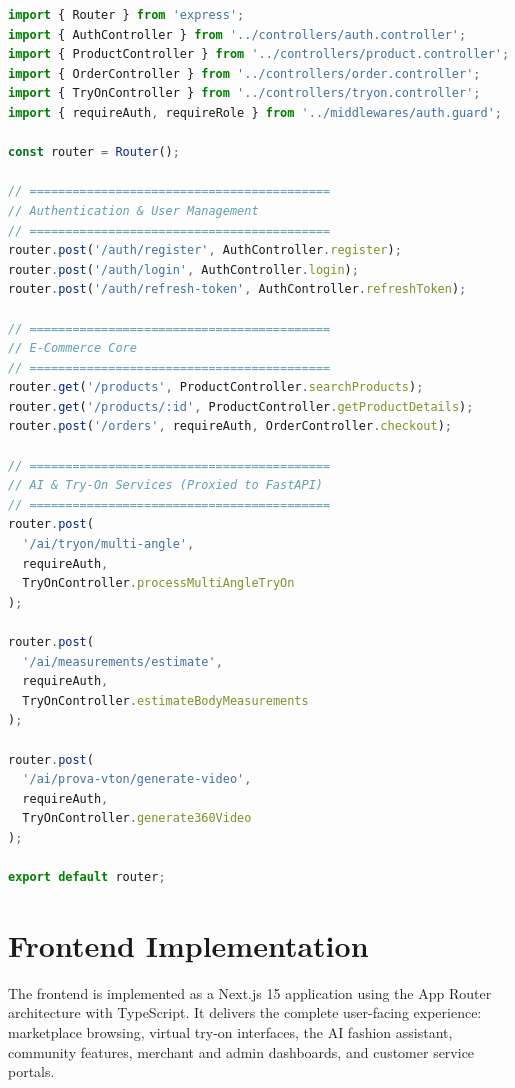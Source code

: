 \begin{lstlisting}[language=JavaScript, caption=Backend API router configuration., label=lst:backend-api]
import { Router } from 'express';
import { AuthController } from '../controllers/auth.controller';
import { ProductController } from '../controllers/product.controller';
import { OrderController } from '../controllers/order.controller';
import { TryOnController } from '../controllers/tryon.controller';
import { requireAuth, requireRole } from '../middlewares/auth.guard';

const router = Router();

// ==========================================
// Authentication & User Management
// ==========================================
router.post('/auth/register', AuthController.register);
router.post('/auth/login', AuthController.login);
router.post('/auth/refresh-token', AuthController.refreshToken);

// ==========================================
// E-Commerce Core
// ==========================================
router.get('/products', ProductController.searchProducts);
router.get('/products/:id', ProductController.getProductDetails);
router.post('/orders', requireAuth, OrderController.checkout);

// ==========================================
// AI & Try-On Services (Proxied to FastAPI)
// ==========================================
router.post(
  '/ai/tryon/multi-angle', 
  requireAuth, 
  TryOnController.processMultiAngleTryOn
);

router.post(
  '/ai/measurements/estimate', 
  requireAuth, 
  TryOnController.estimateBodyMeasurements
);

router.post(
  '/ai/prova-vton/generate-video', 
  requireAuth, 
  TryOnController.generate360Video
);

export default router;
\end{lstlisting}

\section{Frontend Implementation}
\label{sec:impl-frontend}

The frontend is implemented as a Next.js 15 application using the App Router architecture with TypeScript. It delivers the complete user-facing experience: marketplace browsing, virtual try-on interfaces, the AI fashion assistant, community features, merchant and admin dashboards, and customer service portals.

